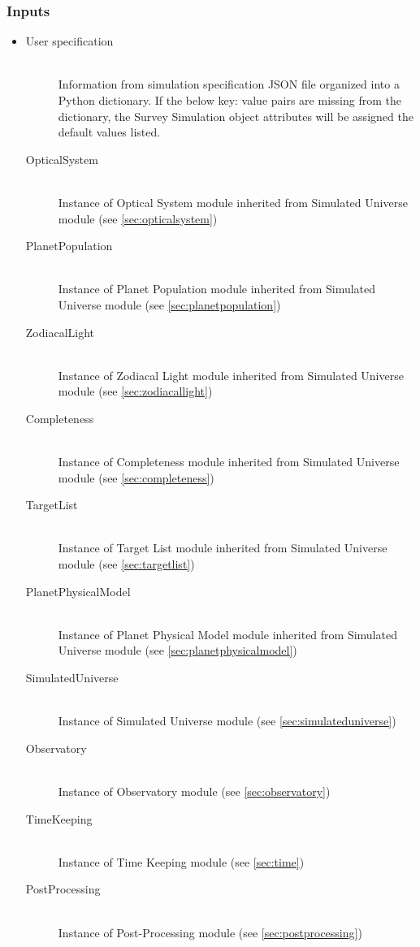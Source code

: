 \documentclass[cleanfoot]{asme2ej}
\begin{document}
\subsubsection*{Inputs}
\begin{itemize}
    \item 
    \begin{description}
        \item[User specification] \hfill \\
        Information from simulation specification JSON file organized into a Python dictionary. If the below key: value pairs are missing from the dictionary, the Survey Simulation object attributes will be assigned the default values listed.
        \item[OpticalSystem] \hfill \\
        Instance of Optical System module inherited from Simulated Universe module (see \ref{sec:opticalsystem})
        \item[PlanetPopulation] \hfill \\
        Instance of Planet Population module inherited from Simulated Universe module (see \ref{sec:planetpopulation})
        \item[ZodiacalLight] \hfill \\
        Instance of Zodiacal Light module inherited from Simulated Universe module (see \ref{sec:zodiacallight})
        \item[Completeness] \hfill \\
        Instance of Completeness module inherited from Simulated Universe module (see \ref{sec:completeness})
        \item[TargetList] \hfill \\
        Instance of Target List module inherited from Simulated Universe module (see \ref{sec:targetlist})
        \item[PlanetPhysicalModel] \hfill \\
        Instance of Planet Physical Model module inherited from Simulated Universe module (see \ref{sec:planetphysicalmodel})
        \item[SimulatedUniverse] \hfill \\
        Instance of Simulated Universe module (see \ref{sec:simulateduniverse})
        \item[Observatory] \hfill \\
        Instance of Observatory module (see \ref{sec:observatory})
        \item[TimeKeeping] \hfill \\
        Instance of Time Keeping module (see \ref{sec:time})
        \item[PostProcessing] \hfill \\
        Instance of Post-Processing module (see \ref{sec:postprocessing})
    \end{description}
\end{itemize}
\end{document}
